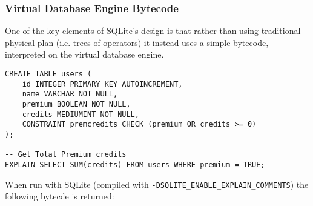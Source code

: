 \subsubsection{Virtual Database Engine Bytecode}
One of the key elements of SQLite's design is that rather than using traditional physical plan (i.e. trees of operators) it instead uses a simple bytecode, interpreted on the virtual database engine.
\begin{verbatim}
CREATE TABLE users (
    id INTEGER PRIMARY KEY AUTOINCREMENT,
    name VARCHAR NOT NULL,
    premium BOOLEAN NOT NULL,
    credits MEDIUMINT NOT NULL,
    CONSTRAINT premcredits CHECK (premium OR credits >= 0)
);

-- Get Total Premium credits
EXPLAIN SELECT SUM(credits) FROM users WHERE premium = TRUE;
\end{verbatim}
When run with SQLite (compiled with \texttt{-DSQLITE_ENABLE_EXPLAIN_COMMENTS}) the following bytecde is returned:
